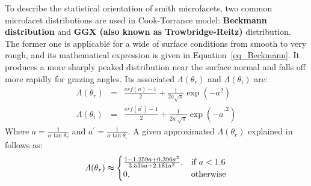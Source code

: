 \begin{itemize}
          To describe the statistical orientation of smith microfacets, two common microfacet distributions are used in Cook-Torrance model: \textbf{Beckmann distribution} and \textbf{GGX (also known as Trowbridge-Reitz)} distribution.
          The former one is applicable for a wide of surface conditions from smooth to very rough, and its mathematical expression is given in Equation~\eqref{eq_Beckmann}.
          It produces a more sharply peaked distribution near the surface normal and falls off more rapidly for grazing angles.
          Its associated $\varLambda(\theta_r)$ and $\varLambda(\theta_i)$ are:
          \begin{equation}
              \label{eq_varLambda}
              \begin{array}{lll}
                  \varLambda(\theta_r) & = & \frac{erf(a) - 1}{2} + \frac{1}{2a\sqrt{\pi}} \exp(-a^2)                        \\
                  \varLambda(\theta_i) & = & \frac{erf(a^\prime) - 1}{2} + \frac{1}{2a^\prime\sqrt{\pi}} \exp(-{a^\prime}^2)
              \end{array}
          \end{equation}
          Where $a = \frac{1}{\alpha \tan\theta_r}$ and $a^\prime = \frac{1}{\alpha \tan\theta_i}$.
          A given approximated $\varLambda(\theta_r)$ explained in~\cite{2007_Walter,2014_Heitz} follows as:
          \begin{equation}
              \varLambda(\theta_r) \thickapprox \begin{cases}
                  \frac{1 - 1.259a + 0.396a^2}{3.535a + 2.181a^2}, & \mbox{if $a <1.6$} \\
                  0,                                               & \mbox{otherwise}
              \end{cases}
          \end{equation}


\end{itemize}
